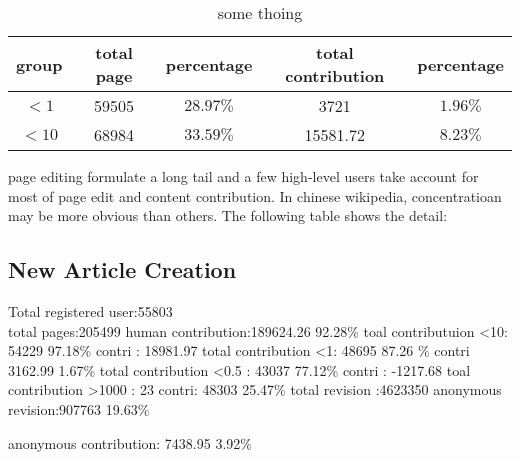 \documentclass{elsarticle}
\begin{document}
\begin{table}[h]
  \centering
   \caption{some thoing}
 \begin{tabular}[center]{|c|c|c|c|c|}
  
   \hline
    group&total page&percentage&total contribution&percentage \\\hline
    $<1$&59505&$28.97\%$&3721&$1.96\%$ \\\hline
    $<10$&68984&$33.59\%$&15581.72&$8.23\%$ \\\hline
  \end{tabular}
  
\end{table}
page editing formulate a long tail and a few high-level users take
account for most of page edit and content contribution. In chinese
wikipedia, concentratioan may be more obvious than others. The
following table shows the detail:


\subsection{New Article Creation}
\label{sec:new-article-creation}



Total registered user:55803 \\

total pages:205499
human contribution:189624.26 92.28\%
toal contributuion <10: 54229  97.18\%  contri : 18981.97
total contribution <1: 48695 87.26 \%  contri 3162.99 1.67\%
total contribution <0.5 : 43037 77.12\%  contri : -1217.68
toal contribution >1000 : 23  contri: 48303 25.47\%
total revision :4623350
anonymous revision:907763 19.63\%

anonymous contribution: 7438.95 3.92\%


\end{document}
